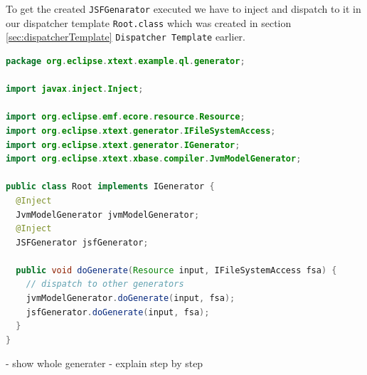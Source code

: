 To get the created \texttt{JSFGenarator} executed we have to inject and dispatch
to it in our dispatcher template \texttt{Root.class}
which was created in section \ref{sec:dispatcherTemplate}
\texttt{Dispatcher Template} earlier.

\begin{lstlisting}[language=Java] 
 package org.eclipse.xtext.example.ql.generator;

import javax.inject.Inject;

import org.eclipse.emf.ecore.resource.Resource;
import org.eclipse.xtext.generator.IFileSystemAccess;
import org.eclipse.xtext.generator.IGenerator;
import org.eclipse.xtext.xbase.compiler.JvmModelGenerator;

public class Root implements IGenerator {
  @Inject
  JvmModelGenerator jvmModelGenerator;
  @Inject
  JSFGenerator jsfGenerator;

  public void doGenerate(Resource input, IFileSystemAccess fsa) {
    // dispatch to other generators
    jvmModelGenerator.doGenerate(input, fsa);
    jsfGenerator.doGenerate(input, fsa);
  }
}
\end{lstlisting}


- show whole generater
- explain step by step